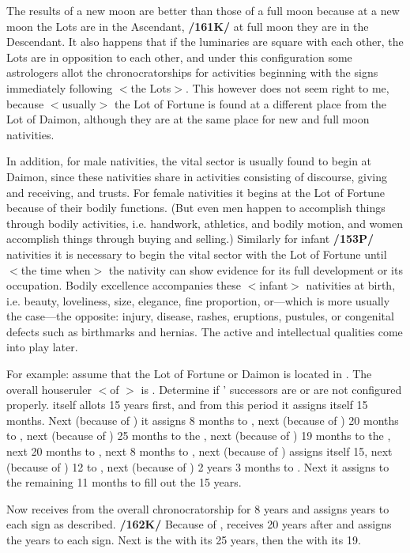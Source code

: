 The results of a new moon are better than those of a full
moon because at a new moon the Lots are in the Ascendant, \textbf{/161K/} at full moon they are in the Descendant. It also happens that if the luminaries are square with each other, the Lots are in opposition to each other, and under this configuration some astrologers allot the chronocratorships for activities beginning with the signs immediately following $<$the Lots$>$. This however does not seem right to me, because
$<$usually$>$ the Lot of Fortune is found at a different place from the Lot of Daimon, although they are at the same place for new and full moon nativities.

In addition, for male nativities, the vital sector is usually found to begin at Daimon, since these nativities share in activities consisting of discourse, giving and receiving, and trusts. For female nativities it begins at the Lot of Fortune because of their bodily functions. (But even men happen to accomplish things through bodily activities, i.e. handwork, athletics, and bodily motion, and women accomplish
things through buying and selling.) Similarly for infant \textbf{/153P/} nativities it is necessary to begin the vital
sector with the Lot of Fortune until $<$the time when$>$ the nativity can show evidence for its full development or its occupation. Bodily excellence accompanies these $<$infant$>$ nativities at birth, i.e. beauty, loveliness, size, elegance, fine proportion, or—which is more usually the case—the opposite: injury, disease, rashes, eruptions, pustules, or congenital defects such as birthmarks and hernias. The
active and intellectual qualities come into play later.

For example: assume that the Lot of Fortune or Daimon is located in \Aries. The overall houseruler $<$of \Aries$>$ is \Mars. Determine if \Mars’ successors are or are not configured properly. \Mars\xspace itself allots 15 years first, and from this period it assigns itself 15 months. Next (because of \Taurus) it assigns 8 months to \Venus, next (because of \Gemini) 20 months to \Mercury, next (because of \Cancer) 25 months to the \Moon, next (because of \Leo) 19 months to the \Sun, next 20 months to \Mercury, next 8 months to \Venus,
next (because of \Scorpio) \Mars assigns itself 15, next (because of \Sagittarius) 12 to \Jupiter, next (because of
\Capricorn) 2 years 3 months to \Saturn. Next it assigns to \Aquarius the remaining 11 months to fill out the 15 years. 

Now \Venus\xspace receives from \Mars\xspace the overall chronocratorship for 8 years and assigns years to
each sign as described. \textbf{/162K/} Because of \Gemini, \Mercury\xspace receives 20 years after \Venus\xspace and assigns the years to each sign. Next is the \Moon\xspace with its 25 years, then the \Sun\xspace with its 19. 

